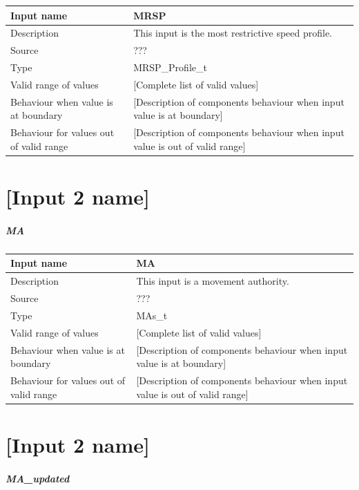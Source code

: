 \begin{longtable}{p{}p{}}
\toprule
Input name				& MRSP \\
\midrule
Description				& This input is the most restrictive speed profile. \\
\midrule
Source					& ??? \\ 
\midrule
Type					& MRSP\_Profile\_t \\
\midrule
Valid range of values	& [Complete list of valid values] \\
\midrule
Behaviour when value is at boundary	& [Description of components behaviour when input value is at boundary] \\
\midrule
Behaviour for values out of valid range	& [Description of components behaviour when input value is out of valid range] \\
\bottomrule
\end{longtable}\chapter{[Input 2 name]}


\paragraph{MA}

\begin{longtable}{p{}p{}}
\toprule
Input name				& MA \\
\midrule
Description				& This input is a movement authority. \\
\midrule
Source					& ??? \\ 
\midrule
Type					& MAs\_t \\
\midrule
Valid range of values	& [Complete list of valid values] \\
\midrule
Behaviour when value is at boundary	& [Description of components behaviour when input value is at boundary] \\
\midrule
Behaviour for values out of valid range	& [Description of components behaviour when input value is out of valid range] \\
\bottomrule
\end{longtable}\chapter{[Input 2 name]}


\paragraph{MA\_updated}

